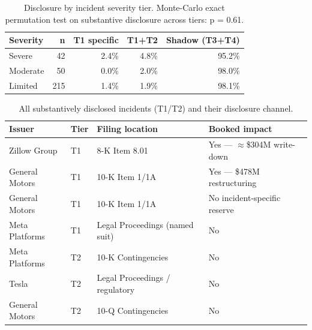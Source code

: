 \documentclass[utf8]{FrontiersinHarvard}
\begin{document}
\begin{table}[h!]
\caption{Disclosure by incident severity tier. Monte-Carlo exact permutation test on substantive disclosure across tiers: p = 0.61.}
\label{tab:sev}
\centering
\begin{tabular}{@{}lrrrr@{}}
\toprule
Severity & n & T1 specific & T1+T2 & Shadow (T3+T4) \\ \midrule
Severe   & 42  & 2.4\% & 4.8\% & 95.2\% \\
Moderate & 50  & 0.0\% & 2.0\% & 98.0\% \\
Limited  & 215 & 1.4\% & 1.9\% & 98.1\% \\ \bottomrule
\end{tabular}
\end{table}

\begin{table}[h!]
\caption{All substantively disclosed incidents (T1/T2) and their disclosure channel.}
\label{tab:acct}
\centering
\begin{tabular}{@{}llll@{}}
\toprule
Issuer & Tier & Filing location & Booked impact \\ \midrule
Zillow Group    & T1 & 8-K Item 8.01                 & Yes --- $\approx$\$304M write-down \\
General Motors  & T1 & 10-K Item 1/1A                & Yes --- \$478M restructuring \\
General Motors  & T1 & 10-K Item 1/1A                & No incident-specific reserve \\
Meta Platforms  & T1 & Legal Proceedings (named suit) & No \\
Meta Platforms  & T2 & 10-K Contingencies           & No \\
Tesla           & T2 & Legal Proceedings / regulatory & No \\
General Motors  & T2 & 10-Q Contingencies           & No \\ \bottomrule
\end{tabular}
\end{table}
\end{document}
